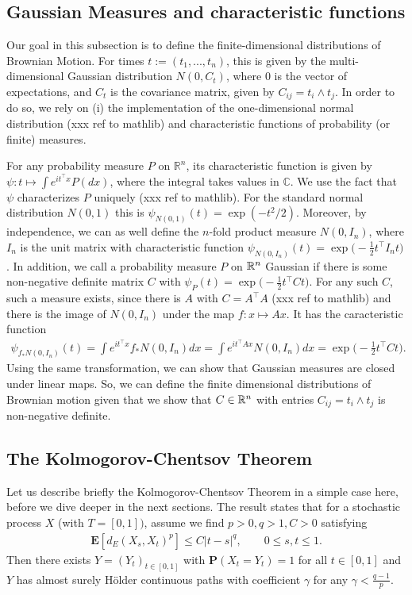\documentclass[lean]{Draft}
\begin{document}
\subsection{Gaussian Measures and characteristic functions}
\label{ss:char}
Our goal in this subsection is to define the finite-dimensional distributions of Brownian Motion. For times $t := (t_1, ..., t_n)$, this is given by the multi-dimensional Gaussian distribution $N(0, C_t)$, where $0$ is the vector of expectations, and $C_t$ is the covariance matrix, given by $C_{ij} = t_i \wedge t_j$. In order to do so, we rely on (i) the implementation of the one-dimensional normal distribution (xxx ref to mathlib) and characteristic functions of probability (or finite) measures.

For any probability measure $P$ on $\mathbb R^n$, its characteristic function is given by $\psi: t \mapsto \int e^{it^\top x} P(dx)$, where the integral takes values in $\mathbb C$. We use the fact that $\psi$ characterizes $P$ uniquely (xxx ref to mathlib). For the standard normal distribution $N(0,1)$ this is $\psi_{N(0,1)}(t) = \exp(-t^2/2)$. Moreover, by independence, we can as well define the $n$-fold product measure $N(0, I_n)$, where $I_n$ is the unit matrix with characteristic function $\psi_{N(0,I_n)}(t) = \exp\big(-\tfrac 12 t^\top I_n t\big)$. In addition, we call a probability measure $P$ on $\mathbb{R}^n$ Gaussian if there is some non-negative definite matrix $C$ with $\psi_P(t) = \exp\big( - \tfrac 12 t^\top C t\big)$. For any such $C$, such a measure exists, since there is $A$ with $C = A^\top A$ (xxx ref to mathlib) and there is the image of $N(0,I_n)$ under the map $f : x\mapsto Ax$. It has the caracteristic function
\begin{align} \label{eq:gausslin}
\psi_{f_\ast N(0,I_n)}(t) = \int e^{it^\top x} f_\ast N(0,I_n) dx = \int e^{it^\top A x} N(0,I_n) dx = \exp\big( - \tfrac 12 t^\top C t\big).
\end{align}
Using the same transformation, we can show that Gaussian measures are closed under linear maps.
So, we can define the finite dimensional distributions of Brownian motion given that we show that $C \in \mathbb{R}^n$ with entries $C_{ij} = t_i \wedge t_j$ is non-negative definite.

\cite{hairer2009introduction}

\subsection{The Kolmogorov-Chentsov Theorem}
Let us describe briefly the Kolmogorov-Chentsov Theorem in a simple case here, before we dive deeper in the next sections. The result states that for a stochastic process $X$ (with $T = [0,1])$, assume we find $p>0, q>1, C > 0$ satisfying
\begin{align}
\label{eq:cs}
  \mathbf E[d_E(X_s, X_t)^p] \leq C|t-s|^q, \qquad 0\leq s,t\leq 1.
\end{align}
Then there exists $Y = (Y_t)_{t\in [0,1]}$ with $\mathbf P(X_t = Y_t) = 1$ for all $t\in [0,1]$ and $Y$ has almost surely Hölder continuous paths with coefficient $\gamma$ for any $\gamma < \tfrac {q-1} p$.
\end{document}
